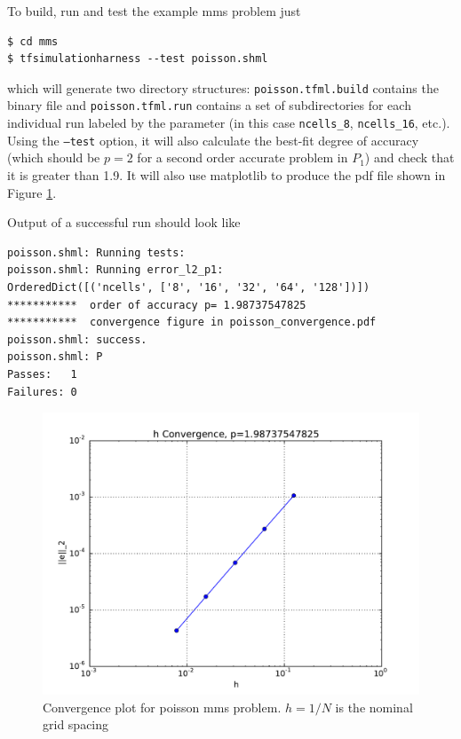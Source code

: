 To build, run and test the example mms problem just
\begin{lstlisting}[style=Bash]
$ cd mms
$ tfsimulationharness --test poisson.shml
\end{lstlisting} %
which will generate two directory structures:
\texttt{poisson.tfml.build} contains the binary file and
\texttt{poisson.tfml.run} contains a set of subdirectories for each
individual run labeled by the parameter (in this case
\texttt{ncells\_8}, \texttt{ncells\_16}, etc.).   Using the
\texttt{--test} option, it will also calculate the best-fit degree of
accuracy (which should be $p=2$ for a second order accurate problem in
$P_1$) and check that it is greater than 1.9.  It will also use
matplotlib to produce the pdf file shown in  Figure
\ref{fig:poisson_convergence}.

Output of a successful run should look like
\begin{lstlisting}[style=Bash]
poisson.shml: Running tests:
poisson.shml: Running error_l2_p1:
OrderedDict([('ncells', ['8', '16', '32', '64', '128'])])
***********  order of accuracy p= 1.98737547825
***********  convergence figure in poisson_convergence.pdf
poisson.shml: success.
poisson.shml: P
Passes:   1
Failures: 0
\end{lstlisting}

\begin{figure}[ht!]
  \centering
\includegraphics[width=.6\textwidth]{figures/poisson_convergence.pdf}
  \caption{Convergence plot for poisson mms problem. $h=1/N$ is the nominal grid spacing}
  \label{fig:poisson_convergence}
\end{figure}






